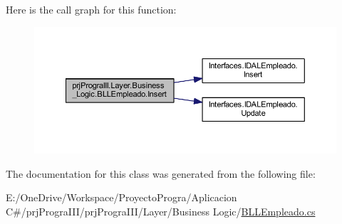 Here is the call graph for this function\+:
\nopagebreak
\begin{figure}[H]
\begin{center}
\leavevmode
\includegraphics[width=350pt]{classprj_progra_i_i_i_1_1_layer_1_1_business___logic_1_1_b_l_l_empleado_a80ef323c864712e491fa040752455d0e_cgraph}
\end{center}
\end{figure}


The documentation for this class was generated from the following file\+:\begin{DoxyCompactItemize}
\item 
E\+:/\+One\+Drive/\+Workspace/\+Proyecto\+Progra/\+Aplicacion C\#/prj\+Progra\+I\+I\+I/prj\+Progra\+I\+I\+I/\+Layer/\+Business Logic/\hyperlink{_b_l_l_empleado_8cs}{B\+L\+L\+Empleado.\+cs}\end{DoxyCompactItemize}
